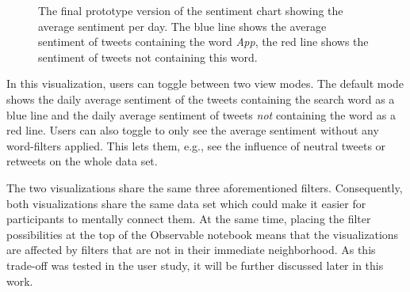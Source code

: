 \begin{figure}[htb!]
    \caption{The final prototype version of the sentiment chart showing the average sentiment per day. The blue line shows the average sentiment of tweets containing the word \emph{App}, the red line shows the sentiment of tweets not containing this word.}
    \label{fig:sentiment_linechart}
\end{figure}

In this visualization, users can toggle between two view modes. The default mode shows the daily average sentiment of the tweets containing the search word as a blue line and the daily average sentiment of tweets \emph{not} containing the word as a red line. Users can also toggle to only see the average sentiment without any word-filters applied. This lets them, e.g., see the influence of neutral tweets or retweets on the whole data set.

The two visualizations share the same three aforementioned filters. Consequently, both visualizations share the same data set which could make it easier for participants to mentally connect them. At the same time, placing the filter possibilities at the top of the Observable notebook means that the visualizations are affected by filters that are not in their immediate neighborhood. As this trade-off was tested in the user study, it will be further discussed later in this work.


